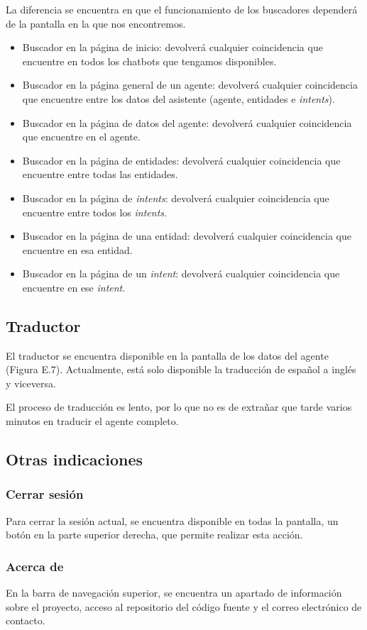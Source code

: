 La diferencia se encuentra en que el funcionamiento de los buscadores dependerá de la pantalla en la que nos encontremos.
\begin{itemize}
    \item Buscador en la página de inicio: devolverá cualquier coincidencia que encuentre en todos los chatbots que tengamos disponibles.
    \item Buscador en la página general de un agente: devolverá cualquier coincidencia que encuentre entre los datos del asistente (agente, entidades e \textit{intents}).
    \item Buscador en la página de datos del agente: devolverá cualquier coincidencia que encuentre en el agente.
    \item Buscador en la página de entidades: devolverá cualquier coincidencia que encuentre entre todas las entidades.
    \item Buscador en la página de \textit{intents}: devolverá cualquier coincidencia que encuentre entre todos los \textit{intents}.
    \item Buscador en la página de una entidad: devolverá cualquier coincidencia que encuentre en esa entidad.
    \item Buscador en la página de un \textit{intent}: devolverá cualquier coincidencia que encuentre en ese \textit{intent}.
\end{itemize}

\subsection{Traductor}
El traductor se encuentra disponible en la pantalla de los datos del agente (Figura E.7). Actualmente, está solo disponible la traducción de español a inglés y viceversa.

El proceso de traducción es lento, por lo que no es de extrañar que tarde varios minutos en traducir el agente completo.


\subsection{Otras indicaciones}
\subsubsection{Cerrar sesión}
Para cerrar la sesión actual, se encuentra disponible en todas la pantalla, un botón en la parte superior derecha, que permite realizar esta acción.

\subsubsection{Acerca de}
En la barra de navegación superior, se encuentra un apartado de información sobre el proyecto, acceso al repositorio del código fuente y el correo electrónico de contacto.
